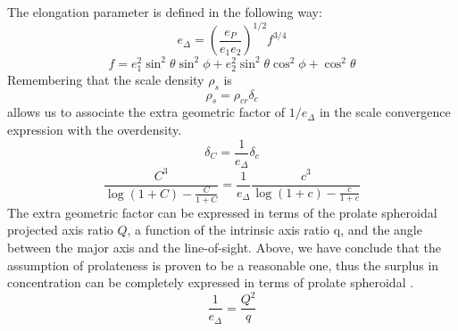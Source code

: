 The elongation parameter is defined in the following way:
\begin{equation}
e_{\Delta} = \left( \frac{e_{P}}{e_{1}e_{2}} \right)^{1/2} f^{3/4}
\end{equation}
\begin{equation}
f = e_{1}^{2} \sin^{2} \theta \sin^{2} \phi + e_{2}^{2}\sin^{2} \theta
\cos^{2} \phi + \cos^{2} \theta
\end{equation}
Remembering that the scale density $\rho_{s}$ is
\begin{equation}
\rho_{s} = \rho_{cr} \delta_{c}
\end{equation}
allows us to associate the extra geometric factor of $1/e_{\Delta}$ in
the scale convergence expression with the overdensity. 
\begin{equation}
\delta_{C} = \frac{1}{e_{\Delta}} \delta_{c}
\end{equation}
\begin{equation}
\frac{C^{3}}{\log{\left(1+C\right)} - \frac{C}{1+C}} = \frac{1}{e_{\Delta}}
\frac{c^{3}}{\log{\left(1+c\right)} - \frac{c}{1+c}}
\end{equation}
The extra geometric factor can be expressed in terms of the prolate 
spheroidal projected axis ratio $Q$, a function of the intrinsic axis
ratio q, and the angle between the major axis and the
line-of-sight. Above, we have conclude that the assumption of
prolateness is proven to be a reasonable one, thus the
surplus in concentration can be completely expressed in terms of
prolate spheroidal .
\begin{equation}
\frac{1}{e_{\Delta}} = \frac{Q^{2}}{q}
\end{equation}

